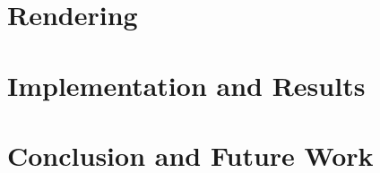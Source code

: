 \section{Rendering}
\label{animationpak_}


\section{Implementation and Results}
\label{animationpak_}


\section{Conclusion and Future Work}
\label{animationpak_}


